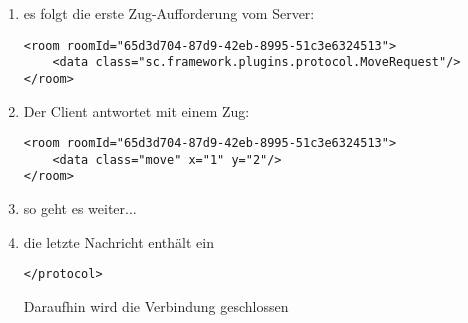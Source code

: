 \documentclass[12pt,a4paper, ngerman, oneside]{scrartcl}
\begin{document}
\begin{enumerate}
\item es folgt die erste Zug-Aufforderung vom Server: \begin{verbatim}
<room roomId="65d3d704-87d9-42eb-8995-51c3e6324513">
    <data class="sc.framework.plugins.protocol.MoveRequest"/>
</room>
\end{verbatim}
\item Der Client antwortet mit einem Zug: \begin{verbatim}
<room roomId="65d3d704-87d9-42eb-8995-51c3e6324513">
    <data class="move" x="1" y="2"/>
</room>
\end{verbatim}
\item so geht es weiter...
\item die letzte Nachricht enth\"alt ein \begin{verbatim}
</protocol>
\end{verbatim}
Daraufhin wird die Verbindung geschlossen
\end{enumerate}
\end{document}
